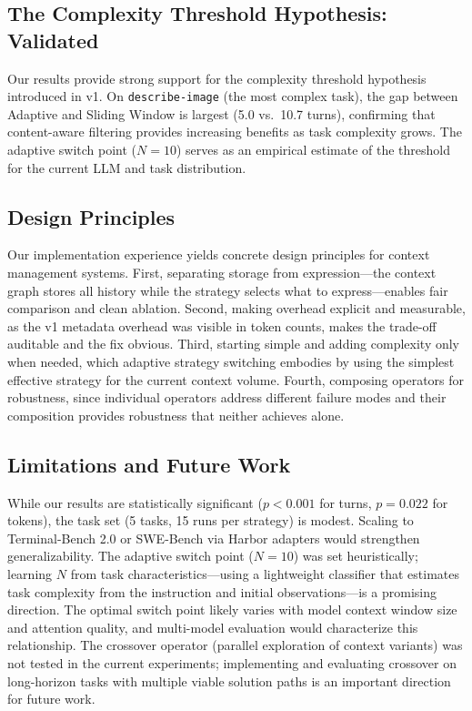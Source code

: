 \subsection{The Complexity Threshold Hypothesis: Validated}

Our results provide strong support for the complexity threshold hypothesis introduced in v1. On \texttt{describe-image} (the most complex task), the gap between Adaptive \EpiContext{} and Sliding Window is largest (5.0 vs.\ 10.7 turns), confirming that content-aware filtering provides increasing benefits as task complexity grows. The adaptive switch point ($N=10$) serves as an empirical estimate of the threshold for the current LLM and task distribution.

\subsection{Design Principles}

Our implementation experience yields concrete design principles for context management systems. First, separating storage from expression---the context graph stores all history while the strategy selects what to express---enables fair comparison and clean ablation. Second, making overhead explicit and measurable, as the v1 metadata overhead was visible in token counts, makes the trade-off auditable and the fix obvious. Third, starting simple and adding complexity only when needed, which adaptive strategy switching embodies by using the simplest effective strategy for the current context volume. Fourth, composing operators for robustness, since individual operators address different failure modes and their composition provides robustness that neither achieves alone.

\subsection{Limitations and Future Work}

While our results are statistically significant ($p < 0.001$ for turns, $p = 0.022$ for tokens), the task set (5 tasks, 15 runs per strategy) is modest. Scaling to Terminal-Bench 2.0 or SWE-Bench via Harbor adapters would strengthen generalizability. The adaptive switch point ($N=10$) was set heuristically; learning $N$ from task characteristics---using a lightweight classifier that estimates task complexity from the instruction and initial observations---is a promising direction. The optimal switch point likely varies with model context window size and attention quality, and multi-model evaluation would characterize this relationship. The crossover operator (parallel exploration of context variants) was not tested in the current experiments; implementing and evaluating crossover on long-horizon tasks with multiple viable solution paths is an important direction for future work.

